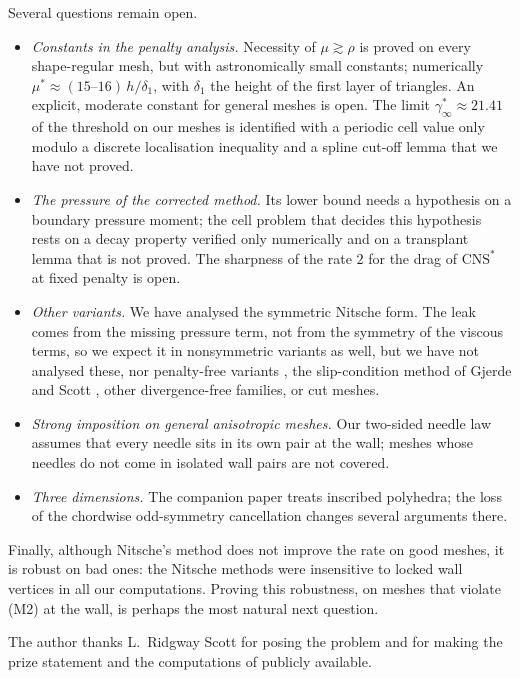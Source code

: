 \documentclass[pdflatex,sn-mathphys-num]{sn-jnl}
\theoremstyle{thmstyleone}
\theoremstyle{thmstylethree}
\newcommand{\CNS}{\mathrm{CNS}^\ast}
\begin{document}
Several questions remain open.
\begin{itemize}
\item \emph{Constants in the penalty analysis.} Necessity of $\mu\gtrsim\rho$ is proved on every shape-regular mesh, but with astronomically small constants; numerically $\mu^\ast\approx(15\text{--}16)\,h/\delta_1$, with $\delta_1$ the height of the first layer of triangles. An explicit, moderate constant for general meshes is open. The limit $\gamma^\ast_\infty\approx21.41$ of the threshold on our meshes is identified with a periodic cell value only modulo a discrete localisation inequality and a spline cut-off lemma that we have not proved.
\item \emph{The pressure of the corrected method.} Its lower bound needs a hypothesis on a boundary pressure moment; the cell problem that decides this hypothesis rests on a decay property verified only numerically and on a transplant lemma that is not proved. The sharpness of the rate $2$ for the drag of $\CNS$ at fixed penalty is open.
\item \emph{Other variants.} We have analysed the symmetric Nitsche form. The leak comes from the missing pressure term, not from the symmetry of the viscous terms, so we expect it in nonsymmetric variants as well, but we have not analysed these, nor penalty-free variants \cite{Burman2012,BoiveauBurman2016}, the slip-condition method of Gjerde and Scott \cite{GjerdeScott2022}, other divergence-free families, or cut meshes.
\item \emph{Strong imposition on general anisotropic meshes.} Our two-sided needle law assumes that every needle sits in its own pair at the wall; meshes whose needles do not come in isolated wall pairs are not covered.
\item \emph{Three dimensions.} The companion paper \cite{PadhiThreeD} treats inscribed polyhedra; the loss of the chordwise odd-symmetry cancellation changes several arguments there.
\end{itemize}
Finally, although Nitsche's method does not improve the rate on good meshes, it is robust on bad ones: the Nitsche methods were insensitive to locked wall vertices in all our computations. Proving this robustness, on meshes that violate (M2) at the wall, is perhaps the most natural next question.

\backmatter

The author thanks L.~Ridgway Scott for posing the problem and for making the prize statement and the computations of \cite{GjerdeScott2024} publicly available.
\end{document}
